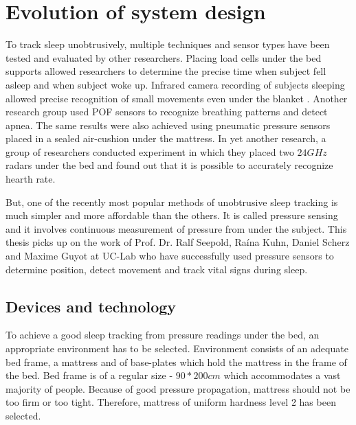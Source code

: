 \chapter{Evolution of system design}
\label{chap:evolution}

To track sleep unobtrusively, multiple techniques and sensor types have been tested and evaluated by other researchers. Placing load cells under the bed supports allowed researchers to determine the precise time when subject fell asleep and when subject woke up\cite{load_cells}. Infrared camera recording of subjects sleeping allowed precise recognition of small movements even under the blanket \cite{video}. Another research group used \ac{POF} sensors to recognize breathing patterns and detect apnea\cite{optical}. The same results were also achieved using pneumatic pressure sensors placed in a sealed air-cushion under the mattress\cite{pneumatic}. In yet another research, a group of researchers conducted experiment in which they placed two $24 GHz$ radars under the bed and found out that it is possible to accurately recognize hearth rate\cite{radar}.

But, one of the recently most popular methods of unobtrusive sleep tracking is much simpler and more affordable than the others. It is called pressure sensing and it involves continuous measurement of pressure from under the subject. This thesis picks up on the work of Prof. Dr. Ralf Seepold, Ra\'ina Kuhn, Daniel Scherz and Maxime Guyot at \ac{UC-Lab}\cite{Kuhn}\cite{Guyot} who have successfully used pressure sensors to determine position, detect movement and track vital signs during sleep.


\section{Devices and technology}

To achieve a good sleep tracking from pressure readings under the bed, an appropriate environment has to be selected. Environment consists of an adequate bed frame, a mattress and of base-plates which hold the mattress in the frame of the bed. Bed frame is of a regular size - $90 * 200cm$ which accommodates a vast majority of people. Because of good pressure propagation, mattress should not be too firm or too tight. Therefore, mattress of uniform hardness level 2 has been selected.

